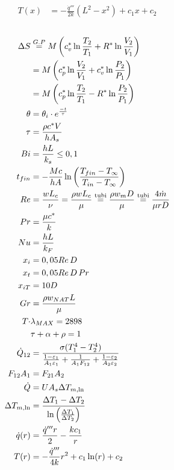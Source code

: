 \documentclass[twocolumn]{article}
\begin{document}
\begin{multicols}{2}
\begin{align*}
        T(x)&=-\frac{\dot{q}'''}{2k}(L^{2}-x^{2}) +c_{1}x+c_{2}
    \end{align*}
    \columnbreak
    \\
    \begin{align*}
        \Delta S &\stackrel{G.P}{=} M\left( c^*_{v}\ln \frac{T_{2}}{T_{1}} + R^*\ln \frac{V_{2}}{V_{1}} \right) \\
         &= M\left( c^*_{p}\ln \frac{V_{2}}{V_{1}}+c^*_{v}\ln \frac{P_{2}}{P_{1}} \right) \\
         &= M\left( c^*_{p}\ln \frac{T_{2}}{T_{1}}-R^*\ln \frac{P_{2}}{P_{1}} \right)\\ 
        \theta &= \theta_{i}\cdot e^{ \frac{-t}{\tau} }\\
        \tau &= \frac{\rho c^{*} V}{hA_{s}}\\
        Bi &= \frac{hL}{k_{s}}\leq 0,1 \\
        t_{fin} &= -\frac{Mc}{hA}\ln\left( \frac{T_{fin}-T_{\infty}}{T_{in}-T_{\infty}} \right)\\
        Re &= \frac{wL_{c}}{\nu} = \frac{\rho wL_{c}}{\mu} \stackrel{\text{tubi}}{=} \frac{\rho w_{m}D}{\mu} \stackrel{\text{tubi}}{=} \frac{4\dot{m}}{\mu rD} \\
        Pr &= \frac{\mu c^{*}}{k} \\
        Nu &= \frac{hL}{k_{F}} \\
        x_{i}&=0,05Re\, D\\
        x_{t}&=0,05Re\, D\, Pr \\
        x_{iT}&=10D \\
        Gr &= \frac{\rho w_{\small{NAT}}L}{\mu} \\
        T\cdot&\lambda_{\small{MAX}}= 2898 \\
        &\tau+\alpha+\rho =1 \\
        \dot{Q}_{12} &= \frac{\sigma(T_{1}^{4}-T_{2}^{4})}{\frac{1-\varepsilon_{1}}{A_{1}\varepsilon_{1}}+\frac{1}{A_{1}F_{12}}+\frac{1-\varepsilon_{2}}{A_{2}\varepsilon_{2}}}  \\
        F_{12}A_{1}&=F_{21}A_{2}\\
        \dot{Q} &= UA_{s}\Delta T_{m,\ln} \\
        \Delta T_{m,\ln} &= \frac{\Delta T_{1}-\Delta T_{2}}{\ln\left( \frac{\Delta T_{1}}{\Delta T_{2}} \right)}\\\dot{q}(r) &= \frac{\dot{q}'''r}{2}-\frac{kc_{1}}{r} \\
        T(r) &= -\frac{\dot{q}'''}{4k}r^{2}+c_{1}\ln(r)+c_{2}
    \end{align*}
\end{multicols}
\end{document}
